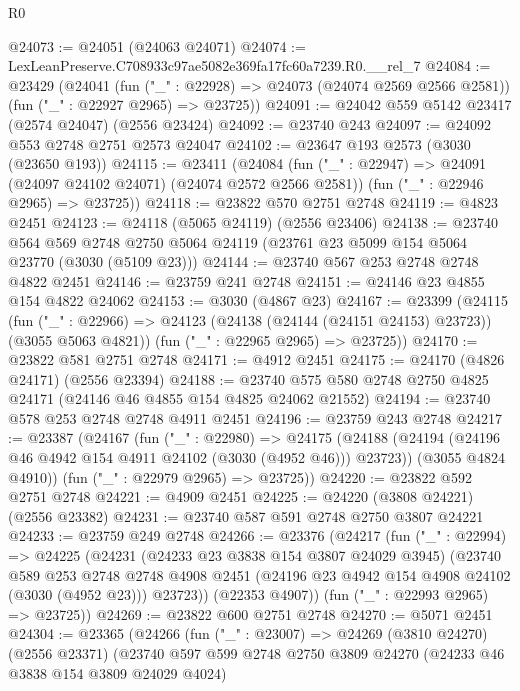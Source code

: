 \begin{lexlean}{R0}
\begin{coremodule}
@24073 := @24051 (@24063 @24071)
@24074 := LexLeanPreserve.C708933c97ae5082e369fa17fc60a7239.R0.__rel_7
@24084 := @23429
    (@24041
      (fun ("_" : @22928) => @24073 (@24074 @2569 @2566 @2581))
      (fun ("_" : @22927 @2965) => @23725))
@24091 := @24042 @559 @5142 @23417 (@2574 @24047) (@2556 @23424)
@24092 := @23740 @243
@24097 := @24092 @553 @2748 @2751 @2573 @24047
@24102 := @23647 @193 @2573 (@3030 (@23650 @193))
@24115 := @23411
    (@24084
      (fun ("_" : @22947) => @24091 (@24097 @24102 @24071) (@24074 @2572 @2566 @2581))
      (fun ("_" : @22946 @2965) => @23725))
@24118 := @23822 @570 @2751 @2748
@24119 := @4823 @2451
@24123 := @24118 (@5065 @24119) (@2556 @23406)
@24138 := @23740
    @564
    @569
    @2748
    @2750
    @5064
    @24119
    (@23761 @23 @5099 @154 @5064 @23770 (@3030 (@5109 @23)))
@24144 := @23740 @567 @253 @2748 @2748 @4822 @2451
@24146 := @23759 @241 @2748
@24151 := @24146 @23 @4855 @154 @4822 @24062
@24153 := @3030 (@4867 @23)
@24167 := @23399
    (@24115
      (fun ("_" : @22966) => @24123 (@24138 (@24144 (@24151 @24153) @23723)) (@3055 @5063 @4821))
      (fun ("_" : @22965 @2965) => @23725))
@24170 := @23822 @581 @2751 @2748
@24171 := @4912 @2451
@24175 := @24170 (@4826 @24171) (@2556 @23394)
@24188 := @23740 @575 @580 @2748 @2750 @4825 @24171 (@24146 @46 @4855 @154 @4825 @24062 @21552)
@24194 := @23740 @578 @253 @2748 @2748 @4911 @2451
@24196 := @23759 @243 @2748
@24217 := @23387
    (@24167
      (fun ("_" : @22980) =>
      @24175
        (@24188 (@24194 (@24196 @46 @4942 @154 @4911 @24102 (@3030 (@4952 @46))) @23723))
        (@3055 @4824 @4910))
      (fun ("_" : @22979 @2965) => @23725))
@24220 := @23822 @592 @2751 @2748
@24221 := @4909 @2451
@24225 := @24220 (@3808 @24221) (@2556 @23382)
@24231 := @23740 @587 @591 @2748 @2750 @3807 @24221
@24233 := @23759 @249 @2748
@24266 := @23376
    (@24217
      (fun ("_" : @22994) =>
      @24225
        (@24231
          (@24233 @23 @3838 @154 @3807 @24029 @3945)
          (@23740
            @589
            @253
            @2748
            @2748
            @4908
            @2451
            (@24196 @23 @4942 @154 @4908 @24102 (@3030 (@4952 @23)))
            @23723))
        (@22353 @4907))
      (fun ("_" : @22993 @2965) => @23725))
@24269 := @23822 @600 @2751 @2748
@24270 := @5071 @2451
@24304 := @23365
    (@24266
      (fun ("_" : @23007) =>
      @24269
        (@3810 @24270)
        (@2556 @23371)
        (@23740
          @597
          @599
          @2748
          @2750
          @3809
          @24270
          (@24233 @46 @3838 @154 @3809 @24029 @4024)

\end{coremodule}
\end{lexlean}
